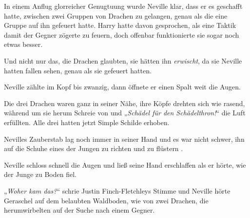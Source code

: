 In einem Anflug glorreicher Genugtuung wurde Neville klar, dass er es geschafft hatte, zwischen zwei Gruppen von Drachen zu gelangen, genau als die eine Gruppe auf ihn gefeuert hatte. Harry hatte davon gesprochen, als eine Taktik damit der Gegner zögerte zu feuern, doch offenbar funktionierte sie sogar noch etwas besser.

Und nicht nur das, die Drachen glaubten, sie hätten ihn \emph{erwischt}, da sie Neville hatten fallen sehen, genau als sie gefeuert hatten.

Neville zählte im Kopf bis zwanzig, dann öffnete er einen Spalt weit die Augen.

Die drei Drachen waren ganz in seiner Nähe, ihre Köpfe drehten sich wie rasend, während um sie herum Schreie von  und „\emph{Schädel für den Schädelthron!}“ die Luft erfüllten. Alle drei hatten jetzt Simple Schilde erhoben.

Nevilles Zauberstab lag noch immer in seiner Hand und es war nicht schwer, ihn auf die Schuhe eines der Jungen zu richten und zu flüstern .

Neville schloss schnell die Augen und ließ seine Hand erschlaffen als er hörte, wie der Junge zu Boden fiel.

„\emph{Woher kam das?}“ schrie Justin Finch-Fletchleys Stimme und Neville hörte Geraschel auf dem belaubten Waldboden, wie von zwei Drachen, die herumwirbelten auf der Suche nach einem Gegner.

